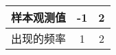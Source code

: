 \begin{table}[h!] %
            \begin{center} %
                \begin{tabular}{c|c c} %
                    样本观测值 & -1 & 2 \\
                    \hline %
                    出现的频率 & 1 & 2
                \end{tabular}
            \end{center}
        \end{table}